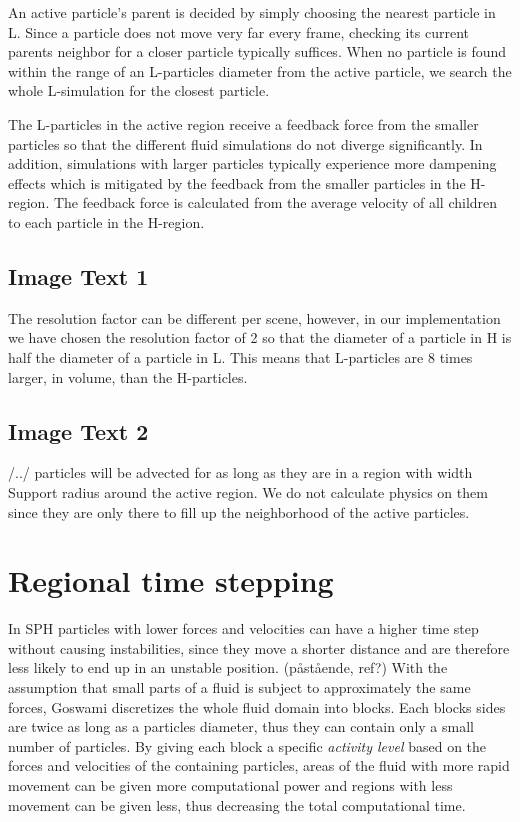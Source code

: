 \documentclass[../../main.tex]{subfiles}
\begin{document}
An active particle's parent is decided by simply choosing the nearest particle in L. Since a particle does not move very far every frame, checking its current parents neighbor for a closer particle typically suffices. When no particle is found within the range of an L-particles diameter from the active particle, we search the whole L-simulation for the closest particle. 

The L-particles in the active region receive a feedback force from the smaller particles so that the different fluid simulations do not diverge significantly. In addition, simulations with larger particles typically experience more dampening effects which is mitigated by the feedback from the smaller particles in the H-region. The feedback force is calculated from the average velocity of all children to each particle in the H-region. 

\subsection{Image Text 1}
The resolution factor can be different per scene, however, in our implementation we have chosen the resolution factor of 2 so that the diameter of a particle in H is half the diameter of a particle in L. This means that L-particles are 8 times larger, in volume, than the H-particles.

\subsection{Image Text 2}
/../ particles will be advected for as long as they are in a region with width Support radius around the active region. We do not calculate physics on them since they are only there to fill up the neighborhood of the active particles.

\section{Regional time stepping}
In SPH particles with lower forces and velocities can have a higher time step without causing instabilities, since they move a shorter distance and are therefore less likely to end up in an unstable position. (påstående, ref?) With the assumption that small parts of a fluid is subject to approximately the same forces, Goswami discretizes the whole fluid domain into blocks. Each blocks sides are twice as long as a particles diameter, thus they can contain only a small number of particles. By giving each block a specific \textit{activity level} based on the forces and velocities of the containing particles, areas of the fluid with more rapid movement can be given more computational power and regions with less movement can be given less, thus decreasing the total computational time. 
\end{document}
